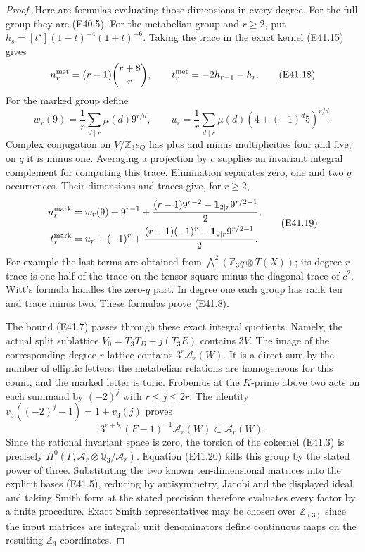 \begin{proof}
Here are formulas evaluating those dimensions in
every degree. For the full group they are (E40.5).
For the metabelian group and $r\ge2$, put
$h_s=[t^s](1-t)^{-4}(1+t)^{-6}$. Taking the trace
in the exact kernel (E41.15) gives
\[
 n_r^{\rm met}=(r-1){r+8\choose r},\qquad
 t_r^{\rm met}=-2h_{r-1}-h_r.
 \tag{E41.18}
\]
For the marked group define
\[
 w_r(9)=\frac1r\sum_{d\mid r}\mu(d)9^{r/d},\qquad
 u_r=\frac1r\sum_{d\mid r}\mu(d)
                  (4+(-1)^d5)^{r/d}.
\]
Complex conjugation on $V/\mathbb Z_3e_Q$
has plus and minus multiplicities four and five;
on $q$ it is minus one. Averaging a projection
by $c$ supplies an invariant integral complement
for computing this trace. Elimination separates
zero, one and two $q$ occurrences. Their dimensions
and traces give, for $r\ge2$,
\[
\begin{split}
 n_r^{\rm mark}
  &=w_r(9)+9^{r-1}
       +\frac{(r-1)9^{r-2}
                       -\mathbf1_{2\mid r}9^{r/2-1}}2,\\
 t_r^{\rm mark}
  &=u_r+(-1)^r
       +\frac{(r-1)(-1)^r
                       -\mathbf1_{2\mid r}9^{r/2-1}}2.
\end{split}
 \tag{E41.19}
\]
For example the last terms are obtained from
$\bigwedge^2(\mathbb Z_3q\otimes T(X))$; its
degree-$r$ trace is one half of the trace on the
tensor square minus the diagonal trace of $c^2$.
Witt's formula handles the zero-$q$ part. In
degree one each group has rank ten and trace
minus two. These formulas prove (E41.8).

The bound (E41.7) passes through these exact
integral quotients. Namely, the actual split
sublattice $V_0=T_3T_D+j(T_3E)$ contains $3V$.
The image of the corresponding degree-$r$ lattice
contains $3^r\mathcal A_r(W)$. It is a direct sum
by the number of elliptic letters: the metabelian
relations are homogeneous for this count, and
the marked letter is toric. Frobenius at the
$K$-prime above two acts on each summand by
$(-2)^j$ with $r\le j\le2r$. The identity
$v_3((-2)^j-1)=1+v_3(j)$ proves
\[
 3^{r+b_r}(F-1)^{-1}\mathcal A_r(W)
                         \subset\mathcal A_r(W).
 \tag{E41.20}
\]
Since the rational invariant space is zero,
the torsion of the cokernel (E41.3) is precisely
$H^0(\Gamma,\mathcal A_r\otimes\mathbb Q_3/\mathcal A_r)$.
Equation (E41.20) kills this group by the stated
power of three. Substituting the two known
ten-dimensional matrices into the explicit
bases (E41.5), reducing by antisymmetry, Jacobi
and the displayed ideal, and taking Smith form
at the stated precision therefore evaluates
every factor by a finite procedure. Exact Smith
representatives may be chosen over
$\mathbb Z_{(3)}$ since the input matrices are
integral; unit denominators define continuous
maps on the resulting $\mathbb Z_3$ coordinates.


\end{proof}
